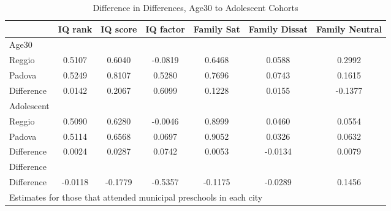 \begin{table}[htbp]\centering
\caption{Difference in Differences, Age30 to Adolescent Cohorts}
\begin{tabular}{l*{6}{c}}
\hline\hline
            &     IQ rank&    IQ score&   IQ factor&  Family Sat&Family Dissat&Family Neutral\\
\hline
Age30       &            &            &            &            &            &            \\
Reggio      &      0.5107&      0.6040&     -0.0819&      0.6468&      0.0588&      0.2992\\
Padova      &      0.5249&      0.8107&      0.5280&      0.7696&      0.0743&      0.1615\\
Difference  &      0.0142&      0.2067&      0.6099&      0.1228&      0.0155&     -0.1377\\
\hline
Adolescent  &            &            &            &            &            &            \\
Reggio      &      0.5090&      0.6280&     -0.0046&      0.8999&      0.0460&      0.0554\\
Padova      &      0.5114&      0.6568&      0.0697&      0.9052&      0.0326&      0.0632\\
Difference  &      0.0024&      0.0287&      0.0742&      0.0053&     -0.0134&      0.0079\\
\hline
Difference  &            &            &            &            &            &            \\
Difference  &     -0.0118&     -0.1779&     -0.5357&     -0.1175&     -0.0289&      0.1456\\
\hline\hline
\multicolumn{7}{l}{\footnotesize Estimates for those that attended municipal preschools in each city}\\
\end{tabular}
\end{table}
